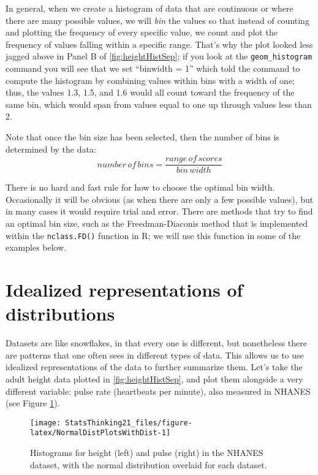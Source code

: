 \documentclass[]{book}
\theoremstyle{definition}
\theoremstyle{definition}
\theoremstyle{definition}
\theoremstyle{remark}
\begin{document}
In general, when we create a histogram of data that are continuous or
where there are many possible values, we will \emph{bin} the values so
that instead of counting and plotting the frequency of every specific
value, we count and plot the frequency of values falling within a
specific range. That's why the plot looked less jagged above in Panel B
of \ref{fig:heightHistSep}; if you look at the \texttt{geom\_histogram}
command you will see that we set ``binwidth = 1'' which told the command
to compute the histogram by combining values within bins with a width of
one; thus, the values 1.3, 1.5, and 1.6 would all count toward the
frequency of the same bin, which would span from values equal to one up
through values less than 2.

Note that once the bin size has been selected, then the number of bins
is determined by the data: \[
number\, of\, bins  = \frac{range\, of\, scores}{bin\, width}
\]

There is no hard and fast rule for how to choose the optimal bin width.
Occasionally it will be obvious (as when there are only a few possible
values), but in many cases it would require trial and error. There are
methods that try to find an optimal bin size, such as the
Freedman-Diaconis method that is implemented within the
\texttt{nclass.FD()} function in R; we will use this function in some of
the examples below.

\section{Idealized representations of
distributions}\label{idealized-representations-of-distributions}

Datasets are like snowflakes, in that every one is different, but
nonetheless there are patterns that one often sees in different types of
data. This allows us to use idealized representations of the data to
further summarize them. Let's take the adult height data plotted in
\ref{fig:heightHistSep}, and plot them alongside a very different
variable: pulse rate (heartbeats per minute), also measured in NHANES
(see Figure \ref{fig:NormalDistPlotsWithDist}).

\begin{figure}
\texttt{[image: StatsThinking21\_files/figure-latex/NormalDistPlotsWithDist-1]} \caption{Histograms for height (left) and pulse (right) in the NHANES dataset, with the normal distribution overlaid for each dataset.}\label{fig:NormalDistPlotsWithDist}
\end{figure}
\end{document}
